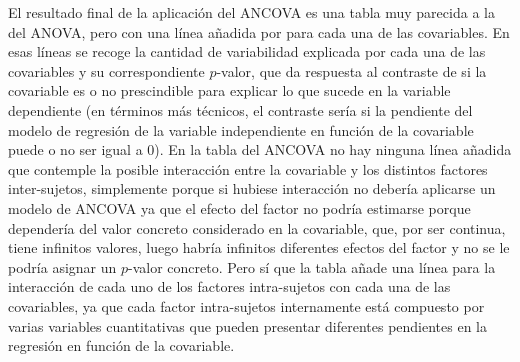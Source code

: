 El resultado final de la aplicación del ANCOVA es una tabla muy parecida a la del ANOVA, pero con una línea añadida por para cada una de las
covariables. En esas líneas se recoge la cantidad de variabilidad explicada por cada una de las covariables y su correspondiente $p$-valor,
que da respuesta al contraste de si la covariable es o no prescindible para explicar lo que sucede en la variable dependiente (en términos
más técnicos, el contraste sería si la pendiente del modelo de regresión de la variable independiente en función de la covariable puede o no
ser igual a 0). En la tabla del ANCOVA no hay ninguna línea añadida que contemple la posible interacción entre la covariable y los distintos
factores inter-sujetos, simplemente porque si hubiese interacción no debería aplicarse un modelo de ANCOVA ya que el efecto del factor no
podría estimarse porque dependería del valor concreto considerado en la covariable, que, por ser continua, tiene infinitos valores, luego
habría infinitos diferentes efectos del factor y no se le podría asignar un $p$-valor concreto. Pero sí que la tabla añade una línea para la
interacción de cada uno de los factores intra-sujetos con cada una de las covariables, ya que cada factor intra-sujetos internamente está
compuesto por varias variables cuantitativas que pueden presentar diferentes pendientes en la regresión en función de la covariable.


